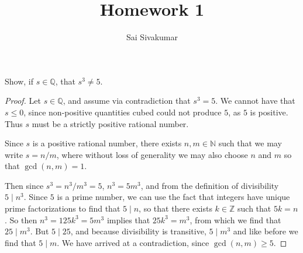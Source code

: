 \documentclass[12pt]{amsart}
\title{Homework 1}
\author{Sai Sivakumar}
\begin{document}
\maketitle

Show, if $s\in \mathbb{Q}$, that $s^3 \neq 5$.

\begin{proof}
    Let $s\in \mathbb{Q}$, and assume via contradiction that $s^3 = 5$. We cannot have that $s \leq 0$, since non-positive quantities cubed could not produce $5$, as $5$ is positive. Thus $s$ must be a strictly positive rational number.
    
    Since $s$ is a positive rational number, there exists $n,m\in \mathbb{N}$ such that we may write $s =n/m$, where without loss of generality we may also choose $n$ and $m$ so that $\gcd(n,m) = 1$.

    Then since $s^3 = n^3/m^3 = 5$, $n^3 = 5m^3$, and from the definition of divisibility $5\mid n^3$. Since $5$ is a prime number, we can use the fact that integers have unique prime factorizations to find that $5\mid n$, so that there exists $k\in\mathbb{Z}$ such that $5k = n$. So then $n^3 = 125k^3 = 5m^3$ implies that $25k^3 = m^3$, from which we find that $25\mid m^3$. But $5\mid 25$, and because divisibility is transitive, $5\mid m^3$ and like before we find that $5\mid m$. We have arrived at a contradiction, since $\gcd(n,m)\geq 5$.
\end{proof}
\end{document}
